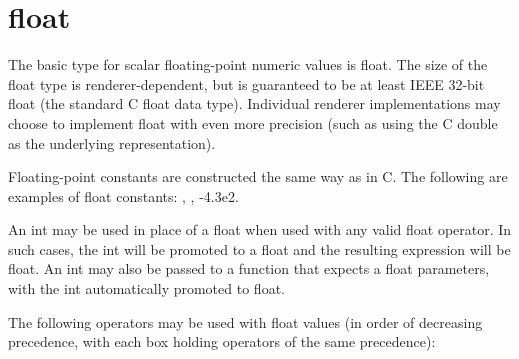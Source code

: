 \documentclass[11pt,letterpaper]{book}
\def\float{{\cf float}\xspace}
\def\inttype{{\cf int}\xspace}
\begin{document}
\section{{\cf float}}
\label{sec:types:float}
 

The basic type for scalar floating-point numeric values is \float.  The
size of the {\cf float} type is renderer-dependent, but is guaranteed to
be at least IEEE 32-bit float (the standard C \float data type).
Individual renderer implementations may choose to implement \float with
even more precision (such as using the C {\cf double} as the underlying
representation).

Floating-point constants are constructed the same way as in C.
The following are examples of {\cf float} constants:  {},
{}, {\cf -4.3e2}.

An \inttype may be used in place of a \float when used with any valid
\float operator.  In such cases, the \inttype will be promoted to a
\float and the resulting expression will be \float.  An \inttype may
also be passed to a function that expects a \float parameters, with the
\inttype automatically promoted to \float.

The following operators may be used with \float values (in order of
decreasing precedence, with each box holding operators of the same
precedence):

\medskip
\end{document}
